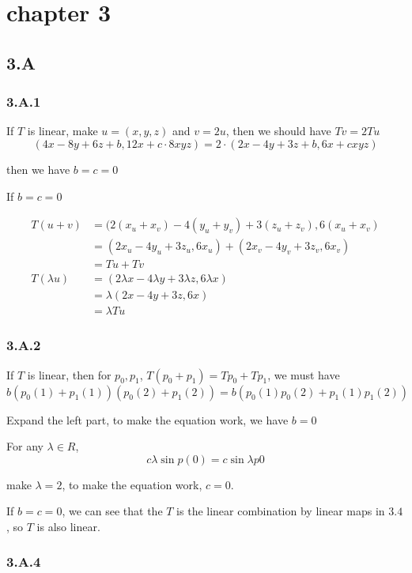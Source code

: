 \section{chapter 3}
\subsection*{3.A}
\subsubsection*{3.A.1}

If $T$ is linear, make $u=(x, y, z)$ and $v=2u$, then we should have $Tv = 2Tu$
\[(4x-8y+6z+b, 12x+c\cdot 8xyz) = 2\cdot (2x-4y+3z+b, 6x+cxyz)\]

then we have $b=c=0$

If $b=c=0$

\begin{equation*}
    \begin{split}
T(u+v) &= (2(x_{u}+x_{v}) - 4(y_{u}+y_{v}) + 3(z_{u}+z_{v}), 6(x_{u}+x_{v}) \\
&= (2x_{u}-4y_{u}+3z_{u}, 6x_{u}) + (2x_{v}-4y_{v}+3z_{v}, 6x_{v}) \\
&= Tu+Tv \\
T(\lambda u) &=(2\lambda x - 4\lambda y + 3\lambda z, 6\lambda x) \\
&= \lambda (2x-4y+3z, 6x) \\
&= \lambda Tu
\end{split}
\end{equation*}

\subsubsection*{3.A.2}

If $T$ is linear, then for $p_{0}, p_{1}$, $T(p_{0}+p_{1}) = Tp_{0} + Tp_{1}$, we must have 
\[b(p_{0}(1)+p_{1}(1))(p_{0}(2)+p_{1}(2)) = b(p_{0}(1)p_{0}(2)+p_{1}(1)p_{1}(2))\]

Expand the left part, to make the equation work, we have $b=0$

For any $\lambda \in R$,
\[c\lambda \sin{p(0)} = c \sin{\lambda p{0}}\]

make $\lambda = 2$, to make the equation work, $c=0$.

If $b=c=0$, we can see that the $T$ is the linear combination by linear maps in $3.4$, so $T$ is also linear.

\subsubsection*{3.A.4}


